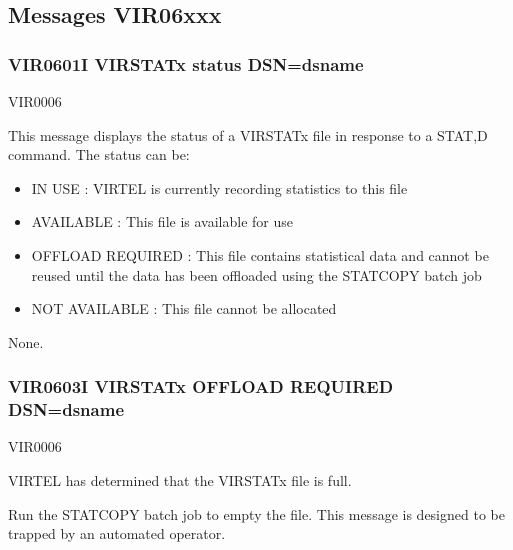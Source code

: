 \documentclass[letterpaper,10pt,english]{sphinxmanual}
\begin{document}
\subsection{Messages VIR06xxx}
\label{\detokenize{messages:messages-vir06xxx}}

\subsubsection{VIR0601I VIRSTATx status DSN=dsname}
\label{\detokenize{messages:vir0601i-virstatx-status-dsn-dsname}}\begin{description}
\sphinxAtStartPar
VIR0006

\sphinxAtStartPar
This message displays the status of a VIRSTATx file in response to a STAT,D command. The status can be:
\begin{itemize}
\item {} 
\sphinxAtStartPar
IN USE : VIRTEL is currently recording statistics to this file

\item {} 
\sphinxAtStartPar
AVAILABLE : This file is available for use

\item {} 
\sphinxAtStartPar
OFFLOAD REQUIRED : This file contains statistical data and cannot be reused until the data has been offloaded using the STATCOPY batch job

\item {} 
\sphinxAtStartPar
NOT AVAILABLE : This file cannot be allocated

\end{itemize}

\sphinxAtStartPar
None.

\end{description}


\subsubsection{VIR0603I VIRSTATx OFFLOAD REQUIRED DSN=dsname}
\label{\detokenize{messages:vir0603i-virstatx-offload-required-dsn-dsname}}\begin{description}
\sphinxAtStartPar
VIR0006

\sphinxAtStartPar
VIRTEL has determined that the VIRSTATx file is full.

\sphinxAtStartPar
Run the STATCOPY batch job to empty the file. This message is designed to be trapped by an automated operator.

\end{description}
\end{document}
